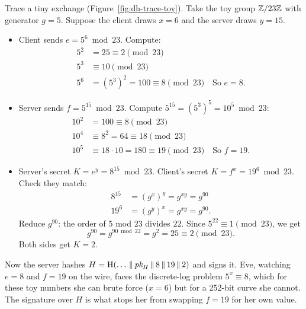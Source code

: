 \begin{walkbox}
Trace a tiny exchange (Figure~\ref{fig:dh-trace-toy}). Take the toy group $\mathbb{Z}/23\mathbb{Z}$ with generator $g = 5$. Suppose the client draws $x = 6$ and the server draws $y = 15$.
\begin{itemize}
  \item Client sends $e = 5^{6} \bmod 23$. Compute:
  \begin{align*}
    5^2 &= 25 \equiv 2 \pmod{23} \\
    5^3 &\equiv 10 \pmod{23} \\
    5^6 &= (5^3)^2 = 100 \equiv 8 \pmod{23} \quad \text{So } e = 8.
  \end{align*}
  \item Server sends $f = 5^{15} \bmod 23$. Compute $5^{15} = (5^3)^5 = 10^5 \bmod 23$:
  \begin{align*}
    10^2 &= 100 \equiv 8 \pmod{23} \\
    10^4 &\equiv 8^2 = 64 \equiv 18 \pmod{23} \\
    10^5 &\equiv 18 \cdot 10 = 180 \equiv 19 \pmod{23} \quad \text{So } f = 19.
  \end{align*}
  \item Server's secret $K = e^{y} = 8^{15} \bmod 23$. Client's secret $K = f^{x} = 19^{6} \bmod 23$. Check they match:
  \begin{align*}
    8^{15} &= (g^{x})^{y} = g^{xy} = g^{90} \\
    19^{6} &= (g^{y})^{x} = g^{xy} = g^{90}.
  \end{align*}
  Reduce $g^{90}$: the order of $5$ mod $23$ divides $22$. Since $5^{22} \equiv 1 \pmod{23}$, we get
  \[
    g^{90} = g^{90 \bmod 22} = g^{2} = 25 \equiv 2 \pmod{23}.
  \]
  Both sides get $K = 2$.
\end{itemize}
Now the server hashes $H = \operatorname{H}(\dots \,\|\, \textit{pk}_H \,\|\, 8 \,\|\, 19 \,\|\, 2)$ and signs it. Eve, watching $e=8$ and $f=19$ on the wire, faces the discrete-log problem $5^{x} \equiv 8$, which for these toy numbers she can brute force ($x=6$) but for a 252-bit curve she cannot. The signature over $H$ is what stops her from swapping $f=19$ for her own value.
\end{walkbox}

